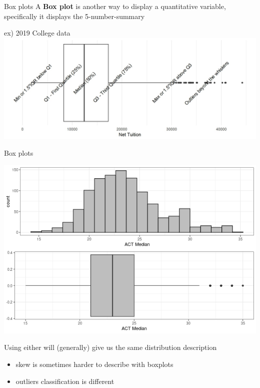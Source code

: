 \documentclass{beamer}
\begin{document}
\begin{frame}{Box plots}
A \textbf{Box plot} is another way to display a quantitative variable, specifically it displays the 5-number-summary \vspace{3mm}

ex) 2019 College data
    \includegraphics[scale=.55]{img/Boxplot_description.jpeg}
\end{frame}


\begin{frame}{Box plots}
\begin{center}
\includegraphics[scale=0.40]{hist_and_box.png}
\end{center}
Using either will (generally) give us the same distribution description
\begin{itemize}
    \item skew is sometimes harder to describe with boxplots
    \item outliers classification is different
\end{itemize}
\end{frame}
\end{document}
